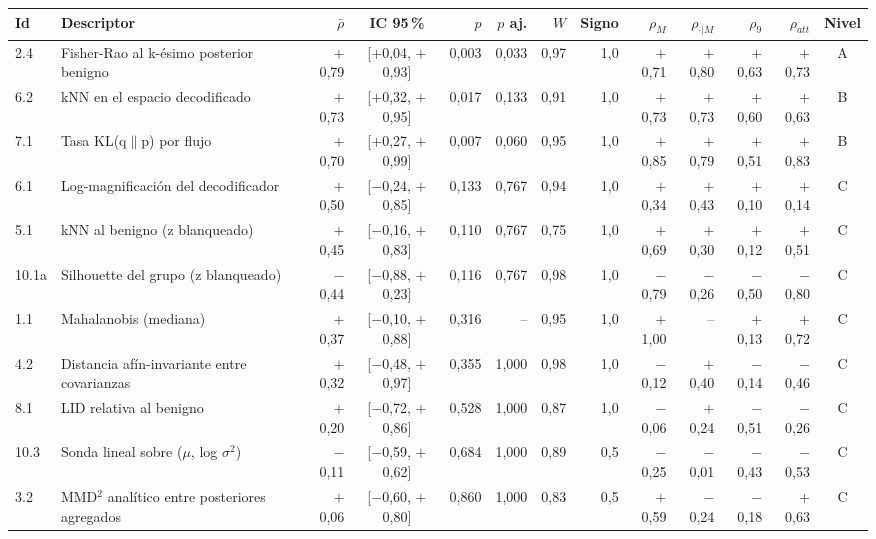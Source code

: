 \begin{tabular}{@{}l>{\raggedright\arraybackslash}p{3.3cm}rcrrrrrrrrc@{}}
\toprule
Id & Descriptor & $\bar\rho$ & IC 95\,\% & $p$ & $p$ aj. & $W$ & Signo & $\rho_{M}$ & $\rho_{\cdot|M}$ & $\rho_{9}$ & $\rho_{att}$ & Nivel \\
\midrule
2.4 & Fisher-Rao al k-ésimo posterior benigno & $+$0{,}79 & [$+$0{,}04, $+$0{,}93] & 0{,}003 & 0{,}033 & 0{,}97 & 1{,}0 & $+$0{,}71 & $+$0{,}80 & $+$0{,}63 & $+$0{,}73 & A \\
6.2 & kNN en el espacio decodificado & $+$0{,}73 & [$+$0{,}32, $+$0{,}95] & 0{,}017 & 0{,}133 & 0{,}91 & 1{,}0 & $+$0{,}73 & $+$0{,}73 & $+$0{,}60 & $+$0{,}63 & B \\
7.1 & Tasa KL(q$\|$p) por flujo & $+$0{,}70 & [$+$0{,}27, $+$0{,}99] & 0{,}007 & 0{,}060 & 0{,}95 & 1{,}0 & $+$0{,}85 & $+$0{,}79 & $+$0{,}51 & $+$0{,}83 & B \\
6.1 & Log-magnificación del decodificador & $+$0{,}50 & [$-$0{,}24, $+$0{,}85] & 0{,}133 & 0{,}767 & 0{,}94 & 1{,}0 & $+$0{,}34 & $+$0{,}43 & $+$0{,}10 & $+$0{,}14 & C \\
5.1 & kNN al benigno (z blanqueado) & $+$0{,}45 & [$-$0{,}16, $+$0{,}83] & 0{,}110 & 0{,}767 & 0{,}75 & 1{,}0 & $+$0{,}69 & $+$0{,}30 & $+$0{,}12 & $+$0{,}51 & C \\
10.1a & Silhouette del grupo (z blanqueado) & $-$0{,}44 & [$-$0{,}88, $+$0{,}23] & 0{,}116 & 0{,}767 & 0{,}98 & 1{,}0 & $-$0{,}79 & $-$0{,}26 & $-$0{,}50 & $-$0{,}80 & C \\
1.1 & Mahalanobis (mediana) & $+$0{,}37 & [$-$0{,}10, $+$0{,}88] & 0{,}316 & -- & 0{,}95 & 1{,}0 & $+$1{,}00 & -- & $+$0{,}13 & $+$0{,}72 & C \\
4.2 & Distancia afín-invariante entre covarianzas & $+$0{,}32 & [$-$0{,}48, $+$0{,}97] & 0{,}355 & 1{,}000 & 0{,}98 & 1{,}0 & $-$0{,}12 & $+$0{,}40 & $-$0{,}14 & $-$0{,}46 & C \\
8.1 & LID relativa al benigno & $+$0{,}20 & [$-$0{,}72, $+$0{,}86] & 0{,}528 & 1{,}000 & 0{,}87 & 1{,}0 & $-$0{,}06 & $+$0{,}24 & $-$0{,}51 & $-$0{,}26 & C \\
10.3 & Sonda lineal sobre ($\mu$, log $\sigma^2$) & $-$0{,}11 & [$-$0{,}59, $+$0{,}62] & 0{,}684 & 1{,}000 & 0{,}89 & 0{,}5 & $-$0{,}25 & $-$0{,}01 & $-$0{,}43 & $-$0{,}53 & C \\
3.2 & MMD$^2$ analítico entre posteriores agregados & $+$0{,}06 & [$-$0{,}60, $+$0{,}80] & 0{,}860 & 1{,}000 & 0{,}83 & 0{,}5 & $+$0{,}59 & $-$0{,}24 & $-$0{,}18 & $+$0{,}63 & C \\
\bottomrule
\end{tabular}
